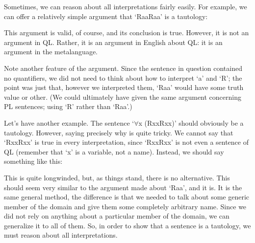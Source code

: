 Sometimes, we can reason about all interpretations fairly easily. For example, we can offer a relatively simple argument that ‘Raa\eor \enot Raa’ is a tautology:


This argument is valid, of course, and its conclusion is true. However, it is not an argument in QL. Rather, it is an argument in English about QL: it is an argument in the metalanguage.

Note another feature of the argument. Since the sentence in question contained no quantifiers, we did not need to think about how to interpret ‘a’ and ‘R’; the point was just that, however we interpreted them, ‘Raa’ would have some truth value or other. (We could ultimately have given the same argument concerning PL sentences; using ‘R' rather than ‘Raa'.)

Let’s have another example. The sentence ‘$\forall$x (Rxx\eor \enot Rxx)’ should obviously be a tautology. However, saying precisely why is quite tricky. We cannot say that ‘Rxx\eor \enot Rxx’ is true in every interpretation, since ‘Rxx\eor \enot Rxx’ is not even a sentence of QL (remember that ‘x’ is a variable, not a name). Instead, we should say something like this:

This is quite longwinded, but, as things stand, there is no alternative. This should seem very similar to the argument made about ‘Raa', and it is. It is the same general method, the difference is that we needed to talk about some generic member of the domain and give them some completely arbitrary name. Since we did not rely on anything about a particular member of the domain, we can generalize it to all of them. So, in order to show that a sentence is a tautology, we must reason about all interpretations.

